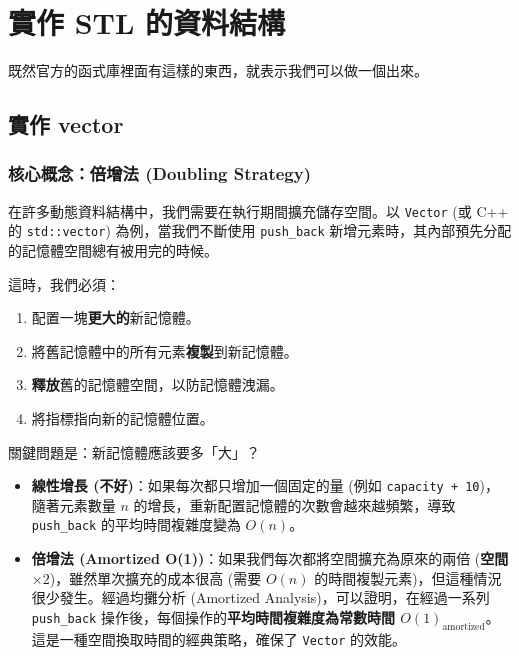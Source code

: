 \section{實作 STL 的資料結構}

既然官方的函式庫裡面有這樣的東西，就表示我們可以做一個出來。

\subsection{實作 vector}

\subsubsection*{核心概念：倍增法 (Doubling Strategy)}

在許多動態資料結構中，我們需要在執行期間擴充儲存空間。以 \verb|Vector| (或 C++ 的 \verb|std::vector|) 為例，當我們不斷使用 \verb|push_back| 新增元素時，其內部預先分配的記憶體空間總有被用完的時候。

這時，我們必須：
\begin{enumerate}
    \item 配置一塊\textbf{更大的}新記憶體。
    \item 將舊記憶體中的所有元素\textbf{複製}到新記憶體。
    \item \textbf{釋放}舊的記憶體空間，以防記憶體洩漏。
    \item 將指標指向新的記憶體位置。
\end{enumerate}

關鍵問題是：新記憶體應該要多「大」？

\begin{itemize}
    \item \textbf{線性增長 (不好)}：如果每次都只增加一個固定的量 (例如 \verb|capacity + 10|)，隨著元素數量 $n$ 的增長，重新配置記憶體的次數會越來越頻繁，導致 \verb|push_back| 的平均時間複雜度變為 $O(n)$。
    \item \textbf{倍增法 (Amortized O(1))}：如果我們每次都將空間擴充為原來的兩倍 (\textbf{空間 $\times 2$})，雖然單次擴充的成本很高 (需要 $O(n)$ 的時間複製元素)，但這種情況很少發生。經過均攤分析 (Amortized Analysis)，可以證明，在經過一系列 \verb|push_back| 操作後，每個操作的\textbf{平均時間複雜度為常數時間 $O(1)_{\text{amortized}}$}。這是一種空間換取時間的經典策略，確保了 \verb|Vector| 的效能。
\end{itemize}

